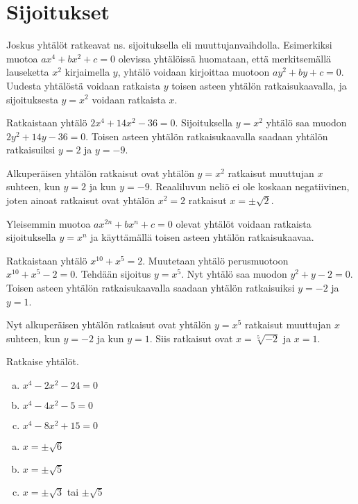 \section{Sijoitukset}
Joskus yhtälöt ratkeavat ns. sijoituksella eli muuttujanvaihdolla. Esimerkiksi muotoa $ax^4+bx^2+c=0$ olevissa yhtälöissä huomataan, että merkitsemällä
lauseketta $x^2$ kirjaimella $y$, yhtälö voidaan kirjoittaa muotoon $ay^2+by+c=0$. Uudesta yhtälöstä voidaan ratkaista $y$ toisen asteen yhtälön
ratkaisukaavalla, ja sijoituksesta $y = x^2$ voidaan ratkaista $x$.

\begin{esimerkki}
Ratkaistaan yhtälö $2x^4+14x^2-36=0$. Sijoituksella $y = x^2$ yhtälö saa muodon $2y^2+14y-36 = 0$. Toisen asteen yhtälön ratkaisukaavalla saadaan yhtälön ratkaisuiksi $y = 2$ ja $y = -9$.

Alkuperäisen yhtälön ratkaisut ovat yhtälön $y = x^2$ ratkaisut muuttujan $x$ suhteen, kun $y = 2$ ja kun $y = -9$. Reaaliluvun neliö ei ole koskaan
negatiivinen, joten ainoat ratkaisut ovat yhtälön $x^2 = 2$ ratkaisut $x = \pm\sqrt{2}$.
\end{esimerkki}

Yleisemmin muotoa $ax^{2n}+bx^n+c=0$ olevat yhtälöt voidaan ratkaista sijoituksella $y = x^n$ ja käyttämällä toisen asteen yhtälön ratkaisukaavaa.

\begin{esimerkki}
Ratkaistaan yhtälö $x^{10}+x^5=2$. Muutetaan yhtälö perusmuotoon $x^{10}+x^5-2=0$. Tehdään sijoitus $y = x^5$. Nyt yhtälö saa muodon $y^2+y-2 = 0$. Toisen asteen yhtälön ratkaisukaavalla saadaan yhtälön ratkaisuiksi $y = -2$ ja $y = 1$.

Nyt alkuperäisen yhtälön ratkaisut ovat yhtälön $y = x^5$ ratkaisut muuttujan $x$ suhteen, kun $y = -2$ ja kun $y = 1$. Siis ratkaisut ovat $x = \sqrt[5]{-2}$ ja $x = 1$.
\end{esimerkki}

\Harjoitustehtavat

\begin{tehtava}
    Ratkaise yhtälöt.
    \begin{enumerate}[a)]
        \item $x^4 - 2x^2 - 24 = 0$
        \item $x^4 - 4x^2 - 5 = 0$
        \item $x^4 - 8x^2 + 15 = 0$
    \end{enumerate}
    \begin{vastaus}
        \begin{enumerate}[a)]
            \item $x = \pm\sqrt{6}$
            \item $x = \pm\sqrt{5}$
            \item $x = \pm\sqrt{3}$ tai $\pm\sqrt{5}$
        \end{enumerate}
    \end{vastaus}
\end{tehtava}

